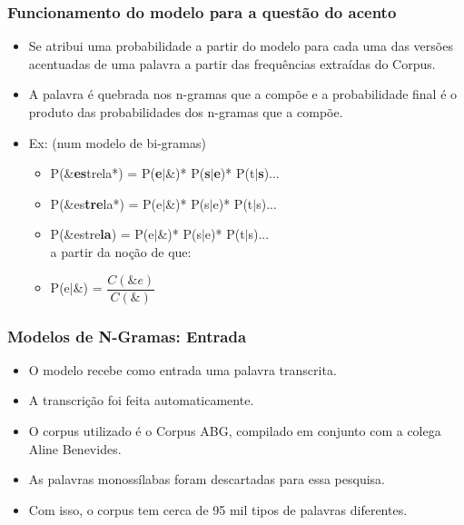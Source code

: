 \documentclass[xcolor=table]{beamer}
\begin{document}
		\begin{frame}
			\frametitle{Funcionamento do modelo para a questão do acento}
			\begin{itemize}
				\item Se atribui uma probabilidade a partir do modelo para cada uma das versões acentuadas de uma palavra a partir das frequências extraídas do Corpus.\\
				\item A palavra é quebrada nos n-gramas que a compõe e a probabilidade final é o produto das probabilidades dos n-gramas que a compõe.\\
				\item Ex: (num modelo de bi-gramas)
				\begin{itemize}
					\item P(\&\textbf{es}trela*) = P(\textbf{e}$\mid$\&)* P(\textbf{s}$\mid$\textbf{e})* P(t$\mid$\textbf{s})...\\
					\item P(\&es\textbf{tre}la*) = P(e$\mid$\&)* P(s$\mid$e)* P(t$\mid$s)...\\
					\item P(\&estre\textbf{la}) = P(e$\mid$\&)* P(s$\mid$e)* P(t$\mid$s)...\\
					a partir da noção de que:\\
					\item P(e$\mid$\&) = $\dfrac{C(\&e)}{C(\&)}$
				\end{itemize}
			\end{itemize}
		\end{frame}
	
	\begin{frame}
		\frametitle{Modelos de N-Gramas: Entrada}
		\begin{itemize}
		\item O modelo recebe como entrada uma palavra transcrita.\\
		\item A transcrição foi feita automaticamente.\\
		\item O corpus utilizado é o Corpus ABG, compilado em conjunto com a colega Aline Benevides.\\
		\item As palavras monossílabas foram descartadas para essa pesquisa.\\
		\item Com isso, o corpus tem cerca de 95 mil tipos de palavras diferentes.\\
		
		\end{itemize}	
	\end{frame}
	
\end{document}
